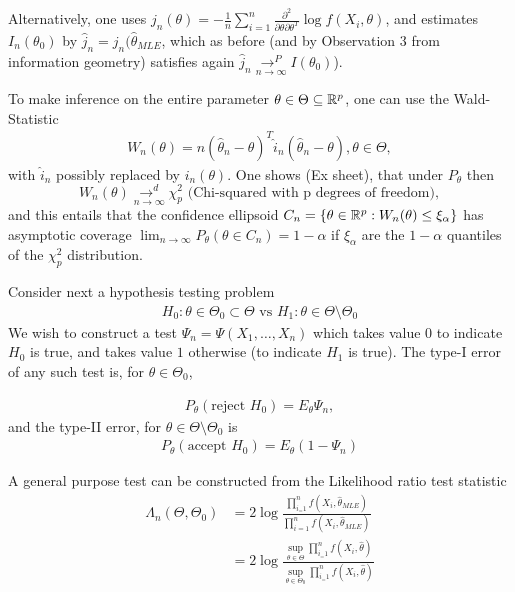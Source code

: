 \documentclass[a4paper]{article}
\begin{document}
Alternatively, one uses $j_n(\theta) = - \frac{1}{n} \sum_{i=1}^{n} \frac{\partial ^2}{\partial \theta\partial\theta^{T}} \log f(X_i, \theta) $, and estimates $I_n(\theta_0)$ by $\hat{j}_n = j_n(\hat{\theta}_{MLE}$, which as before (and by Observation 3 from information geometry) satisfies again $\hat{j}_n \underset{n\to \infty}{\to ^{P}} I(\theta_0)$).

To make inference on the entire parameter $\theta \in  \Theta \subseteq \mathbb{R}^{p}$, one can use the Wald-Statistic
\begin{align*}
	W_n(\theta) = n (\hat{\theta}_n - \theta)^{T} \hat{i}_n (\hat{\theta}_n - \theta), \theta \in \Theta
,\end{align*}
with $\hat{i}_n$ possibly replaced by $i_n(\theta)$. One shows (Ex sheet), that under $P_{\theta}$ then
 \[
	 W_n(\theta) \underset{n\to \infty}{\to ^{d}} \chi^2_{p} \text{ (Chi-squared with p degrees of freedom)}
,\] 
and this entails that the confidence ellipsoid $C_n = \{\theta \in \mathbb{R}^{p} : W_n(\theta) \le \xi_{\alpha}\} $ has asymptotic coverage $\lim_{n\to \infty} P_{\theta}(\theta \in C_n) = 1- \alpha$ if $\xi_{\alpha}$ are the $1- \alpha$ quantiles of the  $\chi^2_{p}$ distribution.

Consider next a hypothesis testing problem
\begin{align*}
	H_0 : \theta \in \Theta_0 \subset \Theta \text{ vs } H_1 : \theta \in \Theta\setminus\Theta_0
\end{align*}
We wish to construct a test $\Psi_n = \Psi(X_1, \ldots, X_n)$ which takes value $0$ to indicate $H_0$ is true, and takes value $1$ otherwise (to indicate $H_1$ is true). The type-I error of any such test is, for $\theta \in \Theta_0$,

\begin{align*}
	P_{\theta}(\text{reject } H_0) = E_{\theta} \Psi_n
,\end{align*}
and the type-II error, for $\theta \in \Theta\setminus\Theta_0$ is
\begin{align*}
	P_{\theta}(\text{accept } H_0) = E_{\theta}(1-\Psi_n)
\end{align*}

\begin{defn}
A general purpose test can be constructed from the Likelihood ratio test statistic
\begin{align*}
	\Lambda_n(\Theta,\Theta_0) &= 2\log \frac{\prod_{i_=1}^{n} f(X_i, \hat{\theta}_{MLE})}{\prod_{i=1}^{n}f(X_i, \hat{\theta}_{MLE})} \\
	&= 2\log \frac{\sup_{\theta \in \Theta} \prod_{i_=1}^{n} f(X_i, \hat{\theta})}{\sup_{\theta \in \Theta_0} \prod_{i_=1}^{n} f(X_i, \hat{\theta})}
\end{align*}
\end{defn}
\end{document}

